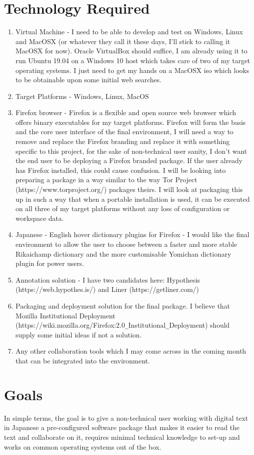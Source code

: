 \documentclass{article}
\begin{document}
\section{Technology Required}
\begin{enumerate}
    \item Virtual Machine - I need to be able to develop and test on Windows, Linux and MacOSX (or whatever they call it these days, I'll stick to calling it MacOSX for now). Oracle VirtualBox should suffice, I am already using it to run Ubuntu 19.04 on a Windows 10 host which takes care of two of my target operating systems. I just need to get my hands on a MacOSX iso which looks to be obtainable upon some initial web searches.
    \item Target Platforms - Windows, Linux, MacOS
    \item Firefox browser - Firefox is a flexible and open source web browser which offers binary executables for my target platforms. Firefox will form the basis and the core user interface of the final environment, I will need a way to remove and replace the Firefox branding and replace it with something specific to this project, for the sake of non-technical user sanity, I don't want the end user to be deploying a Firefox branded package. If the user already has Firefox installed, this could cause confusion. I will be looking into preparing a package in a way similar to the way Tor Project (https://www.torproject.org/) packages theirs. I will look at packaging this up in such a way that when a portable installation is used, it can be executed on all three of my target platforms without any loss of configuration or workspace data.
    \item Japanese - English hover dictionary plugins for Firefox - I would like the final environment to allow the user to choose between a faster and more stable Rikaichamp dictionary and the more customisable Yomichan dictionary plugin for power users.
    \item Annotation solution - I have two candidates here: Hypothesis \newline (https://web.hypothes.is/) and Liner (https://getliner.com/)
    \item Packaging and deployment solution for the final package. I believe that Mozilla Institutional Deployment \newline (https://wiki.mozilla.org/Firefox:2.0\verb|_|Institutional\verb|_|Deployment) should supply some initial ideas if not a solution.
    \item Any other collaboration tools which I may come across in the coming month that can be integrated into the environment.
\end{enumerate}

\section{Goals}
In simple terms, the goal is to give a non-technical user working with digital text in Japanese a pre-configured software package that makes it easier to read the text and collaborate on it, requires minimal technical knowledge to set-up and works on common operating systems out of the box.
\end{document}
